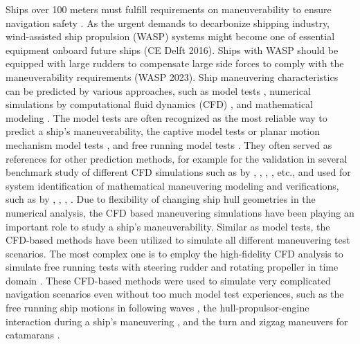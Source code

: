 Ships over 100 meters must fulfill requirements on maneuverability to ensure navigation safety \citep{imoStandardsShipManoeuvrability2002}. As the urgent demands to decarbonize shipping industry, wind-assisted ship propulsion (WASP) systems might become one of essential equipment onboard future ships (CE Delft 2016). Ships with WASP should be equipped with large rudders to compensate large side forces to comply with the maneuverability requirements (WASP 2023). Ship maneuvering characteristics can be predicted by various approaches, such as model tests \citep{ittcManeuveringCommitteeITTC2008}, numerical simulations by computational fluid dynamics (CFD) \citep{elmoctarRANSBasedSimulatedShip2014,dumanTurnZigzagManoeuvres2022}, and mathematical modeling \citep{abkowitzMEASUREMENTHYDRODYNAMICCHARACTERISTICS1980,fossenHandbookMarineCraft2011,yasukawaIntroductionMMGStandard2015,alexanderssonSystemIdentificationPhysicsinformed2024b}. The model tests are often recognized as the most reliable way to predict a ship’s maneuverability, the captive model tests or planar motion mechanism model tests \citep{ittcITTCRecommendedProcedures2008}, and free running model tests \citep{FinalReportRecommendations2021}. They often served as references for other prediction methods, for example for the validation in several benchmark study of different CFD simulations such as by \citet{sternExperienceSIMMAN20082011}, \citet{sakamotoURANSSimulationsStatic2012}, \citet{yoonBenchmarkCFDValidation2015a}, \citet{yasukawaValidation6DOFMotion2021}, etc., and used for system identification of mathematical maneuvering modeling and verifications, such as by \citet{luoParameterIdentificationShip2016}, \citet{xuUncertaintyAnalysisHydrodynamic2019}, \citet{wangOptimalDesignExcitation2020}, \citet{alexanderssonSystemIdentificationVessel2022}. Due to flexibility of changing ship hull geometries in the numerical analysis, the CFD based maneuvering simulations have been playing an important role to study a ship’s maneuverability. Similar as model tests, the CFD-based methods have been utilized to simulate all different maneuvering test scenarios. The most complex one is to employ the high-fidelity CFD analysis to simulate free running tests with steering rudder and rotating propeller in time domain \citep{dubbiosoTurningAbilityAnalysis2016a, islamEstimationHydrodynamicDerivatives2018}. These CFD-based methods were used to simulate very complicated navigation scenarios even without too much model test experiences, such as the free running ship motions in following waves \citep{arakiImprovedManeuveringBasedMathematical2019}, the hull-propulsor-engine interaction during a ship’s maneuvering \citep{elmoctarRANSBasedSimulatedShip2014}, and the turn and zigzag maneuvers for catamarans \citep{dumanTurnZigzagManoeuvres2022}.
